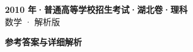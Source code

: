 \documentclass[zihao=-4, a4paper]{ctexart}
\begin{document}
\begin{center}
  {\Large\bfseries 2010 年·普通高等学校招生考试·湖北卷·理科}\\[4pt]
  {\large 数学 · 解析版}
\end{center}
\medskip
{}

\clearpage
{}
\begin{center}{\Large\bfseries 参考答案与详细解析}\end{center}
\medskip

\end{document}
